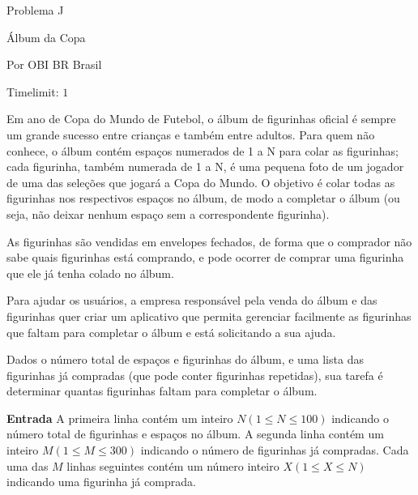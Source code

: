 \begin{center}
Problema J 

Álbum da Copa

{\tiny Por OBI BR Brasil}

Timelimit: $1$	
\end{center}			
			
Em ano de Copa do Mundo de Futebol, o álbum de figurinhas oficial é sempre um grande sucesso entre crianças e também entre adultos. Para quem não conhece, o álbum contém espaços numerados de 1 a N para colar as figurinhas; cada figurinha, também numerada de 1 a N, é uma pequena foto de um jogador de uma das seleções que jogará a Copa do Mundo. O objetivo é colar todas as figurinhas nos respectivos espaços no álbum, de modo a completar o álbum (ou seja, não deixar nenhum espaço sem a correspondente figurinha).

As figurinhas são vendidas em envelopes fechados, de forma que o comprador não sabe quais figurinhas está comprando, e pode ocorrer de comprar uma figurinha que ele já tenha colado no álbum.

Para ajudar os usuários, a empresa responsável pela venda do álbum e das figurinhas quer criar um aplicativo que permita gerenciar facilmente as figurinhas que faltam para completar o álbum e está solicitando a sua ajuda.

Dados o número total de espaços e figurinhas do álbum, e uma lista das figurinhas já compradas (que pode conter figurinhas repetidas), sua tarefa é determinar quantas figurinhas faltam para completar o álbum.
 
\vspace{0.3cm}
\textbf{Entrada}
A primeira linha contém um inteiro $N (1 \leq N \leq 100)$ indicando o número total de figurinhas e espaços no álbum. A segunda linha contém um inteiro $M (1 \leq M \leq 300)$ indicando o número de figurinhas já compradas. Cada uma das $M$ linhas seguintes contém um número inteiro $X (1 \leq X \leq N)$ indicando uma figurinha já comprada.

